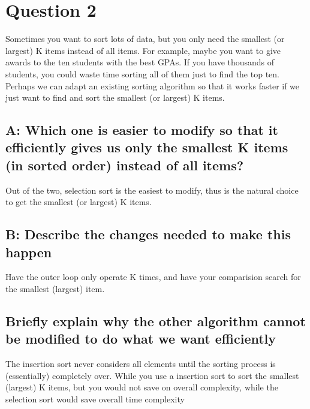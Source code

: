 \documentclass{article}
\begin{document}
\section{Question 2}
Sometimes you want to sort lots of data, but you only need the smallest (or largest) K items instead of all items. For example, maybe you want to give awards to the ten students with the best GPAs. If you have thousands of students, you could waste time sorting all of them just to find the top ten. Perhaps we can adapt an existing sorting algorithm so that it works faster if we just want to find and sort the smallest (or largest) K items.
\subsection{A: Which one is easier to modify so that it efficiently gives us only the smallest K items (in sorted order) instead of all items?}
Out of the two, selection sort is the easiest to modify, thus is the natural choice to get the smallest (or largest) K items.
\subsection{B: Describe the changes needed to make this happen}
Have the outer loop only operate K times, and have your comparision search for the smallest (largest) item.
\subsection{Briefly explain why the other algorithm cannot be modified to do what we want efficiently}
The insertion sort never considers all elements until the sorting process is (essentially) completely over. While you use a insertion sort to sort the smallest (largest) K items, but you would not save on overall complexity, while the selection sort would save overall time complexity
\end{document}
